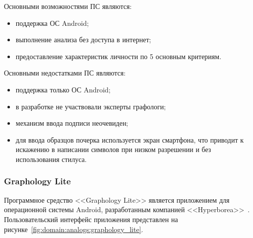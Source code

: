 Основными возможностями ПС являются:
\begin{itemize}
  \item поддержка ОС Android;
  \item выполнение анализа без доступа в интернет;
  \item предоставление характеристик личности по 5 основным критериям.
\end{itemize}

Основными недостатками ПС являются:
\begin{itemize}
  \item поддержка только ОС Android;
  \item в разработке не участвовали эксперты графологи;
  \item механизм ввода подписи неочевиден;
  \item для ввода образцов почерка используется экран смартфона, что приводит к искажению в написании символов при низком разрешении и без использования стилуса.
\end{itemize}

\subsubsection{Graphology Lite}
\label{sub:domain:analogs:graphology_lite}

Программное средство <<Graphology Lite>> является приложением для операционной системы Android, разработанным компанией <<Hyperborea>>~\cite{analogs_graphology_lite}. Пользовательский интерфейс приложения представлен на рисунке~\ref{fig:domain:analogs:graphology_lite}.

